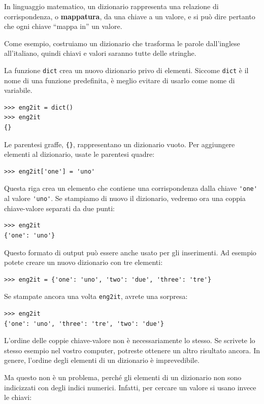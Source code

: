 \documentclass[10pt]{book}
\begin{document}
In linguaggio matematico, un dizionario rappresenta una relazione di corrispondenza, o {\bf mappatura}, da una chiave a un valore, e si può dire pertanto che ogni chiave ``mappa in'' un valore.

Come esempio, costruiamo un dizionario che trasforma le parole dall'inglese all'italiano, quindi chiavi e valori saranno tutte delle stringhe.

La funzione {\tt dict} crea un nuovo dizionario privo di elementi. Siccome {\tt dict} è il nome di una funzione predefinita, è meglio evitare di usarlo come nome di variabile.

\begin{verbatim}
>>> eng2it = dict()
>>> eng2it
{}
\end{verbatim}

Le parentesi graffe, \verb"{}", rappresentano un dizionario vuoto. Per aggiungere elementi al dizionario, usate le parentesi quadre:

\begin{verbatim}
>>> eng2it['one'] = 'uno'
\end{verbatim}
%
Questa riga crea un elemento che contiene una corrispondenza dalla chiave
\verb"'one'" al valore \verb"'uno'".  Se stampiamo di nuovo il dizionario, vedremo ora una coppia chiave-valore separati da due punti:

\begin{verbatim}
>>> eng2it
{'one': 'uno'}
\end{verbatim}
%
Questo formato di output può essere anche usato per gli inserimenti. Ad esempio potete creare un nuovo dizionario con tre elementi:

\begin{verbatim}
>>> eng2it = {'one': 'uno', 'two': 'due', 'three': 'tre'}
\end{verbatim}
%
Se stampate ancora una volta {\tt eng2it}, avrete una sorpresa:

\begin{verbatim}
>>> eng2it
{'one': 'uno', 'three': 'tre', 'two': 'due'}
\end{verbatim}
%
L'ordine delle coppie chiave-valore non è necessariamente lo stesso. Se scrivete lo stesso esempio nel vostro computer, potreste ottenere un altro risultato ancora. In genere, l'ordine degli elementi di un dizionario è imprevedibile.

Ma questo non è un problema, perché gli elementi di un dizionario non sono indicizzati con degli indici numerici. Infatti, per cercare un valore si usano invece le chiavi:
\end{document}
